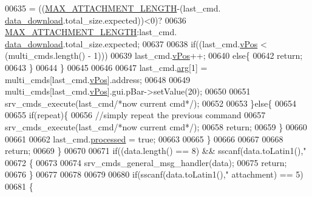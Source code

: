 \begin{DoxyCode}
{{{{{{{{{{{{{{{{{{00635                              = ((\hyperlink{a00086_aa8abe3a822c64813f7aaba3ca7e3db9c}{MAX\_ATTACHMENT\_LENGTH}-(last\_cmd.
      \hyperlink{a00004_a5cfeaed4d4f8e51070a324c0ba893ebe}{data\_download}.total\_size.expected))<0)?
00636                                  \hyperlink{a00086_aa8abe3a822c64813f7aaba3ca7e3db9c}{MAX\_ATTACHMENT\_LENGTH}:last\_cmd.
      \hyperlink{a00004_a5cfeaed4d4f8e51070a324c0ba893ebe}{data\_download}.total\_size.expected;
00637                      
00638                      \textcolor{keywordflow}{if}((last\_cmd.\hyperlink{a00004_a2b48b371fd84be2a8ad581b1ad708b88}{vPos} < (multi\_cmds.length() - 1)))
00639                          last\_cmd.\hyperlink{a00004_a2b48b371fd84be2a8ad581b1ad708b88}{vPos}++;
00640                      \textcolor{keywordflow}{else}\{
00642                          \textcolor{keywordflow}{return};
00643                       \}
00644                      \}
00645 
00646 
00647                      last\_cmd.\hyperlink{a00004_a56e6c2d7315d0ae60a51e8b140c9cfe4}{arg}[1] = multi\_cmds[last\_cmd.\hyperlink{a00004_a2b48b371fd84be2a8ad581b1ad708b88}{vPos}].address;
00648 
00649                      multi\_cmds[last\_cmd.\hyperlink{a00004_a2b48b371fd84be2a8ad581b1ad708b88}{vPos}].gui.pBar->setValue(20);
00650 
00651                      srv\_cmds\_execute(last\_cmd\textcolor{comment}{/*now current cmd*/});
00652 
00653                  \}\textcolor{keywordflow}{else}\{
00654 
00655                      \textcolor{keywordflow}{if}(repeat)\{
00656                         \textcolor{comment}{//simply repeat the previous command}
00657                         srv\_cmds\_execute(last\_cmd\textcolor{comment}{/*now current cmd*/});
00658                         \textcolor{keywordflow}{return};
00659                      \}
00660 
00661 
00662                      last\_cmd.\hyperlink{a00004_a3e88f779da9798a5da7dda227e2ca388}{processed} = \textcolor{keyword}{true};
00663 
00665                  \}
00666 
00667 
00668             \textcolor{keywordflow}{return};
00669          \}
00670 
00671         \textcolor{keywordflow}{if}((data.length() == 8) && sscanf(data.toLatin1(),\textcolor{stringliteral}{"%
00672         \{
00673 
00674             srv\_cmds\_general\_msg\_handler(data);
00675             \textcolor{keywordflow}{return};
00676         \}
00677        
00678         
00679 
00680         \textcolor{keywordflow}{if}(sscanf(data.toLatin1(),\textcolor{stringliteral}{"%
      attachment) == 5)
00681         \{
}}}}}}}}}}}}}}}}}}}}
\end{DoxyCode}
